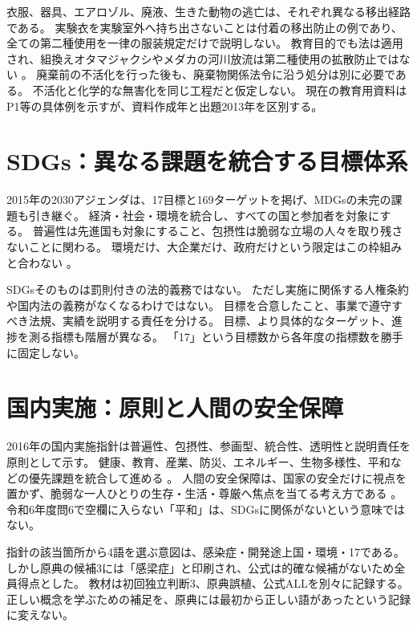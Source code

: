 衣服、器具、エアロゾル、廃液、生きた動物の逃亡は、それぞれ異なる移出経路である。
実験衣を実験室外へ持ち出さないことは付着の移出防止の例であり、全ての第二種使用を一律の服装規定だけで説明しない。
教育目的でも法は適用され、組換えオタマジャクシやメダカの河川放流は第二種使用の拡散防止ではない
\cite{env_biosafety_qa}。
廃棄前の不活化を行った後も、廃棄物関係法令に沿う処分は別に必要である。
不活化と化学的な無害化を同じ工程だと仮定しない。
現在の教育用資料はP1等の具体例を示すが、資料作成年と出題2013年を区別する\cite{env_biosafety_school}。

\section{SDGs：異なる課題を統合する目標体系}
\label{theory:environment:sdgs}
2015年の2030アジェンダは、17目標と169ターゲットを掲げ、MDGsの未完の課題も引き継ぐ。
経済・社会・環境を統合し、すべての国と参加者を対象にする。
普遍性は先進国も対象にすること、包摂性は脆弱な立場の人々を取り残さないことに関わる。
環境だけ、大企業だけ、政府だけという限定はこの枠組みと合わない
\cite{env_sdgs_agenda,env_sdgs_un}。

SDGsそのものは罰則付きの法的義務ではない\cite{env_sdgs_binding}。
ただし実施に関係する人権条約や国内法の義務がなくなるわけではない。
目標を合意したこと、事業で遵守すべき法規、実績を説明する責任を分ける。
目標、より具体的なターゲット、進捗を測る指標も階層が異なる。
「17」という目標数から各年度の指標数を勝手に固定しない。

\section{国内実施：原則と人間の安全保障}
\label{theory:environment:implementation}
2016年の国内実施指針は普遍性、包摂性、参画型、統合性、透明性と説明責任を原則として示す。
健康、教育、産業、防災、エネルギー、生物多様性、平和などの優先課題を統合して進める
\cite{env_sdgs2016,env_sdgs_pamphlet}。
人間の安全保障は、国家の安全だけに視点を置かず、脆弱な一人ひとりの生存・生活・尊厳へ焦点を当てる考え方である
\cite{env_humansecurity}。
令和6年度問6で空欄に入らない「平和」は、SDGsに関係がないという意味ではない。

\begin{tcolorbox}[title=令和元年度再試験問14の扱い]
指針の該当箇所から4語を選ぶ意図は、感染症・開発途上国・環境・17である。
しかし原典の候補3には「感梁症」と印刷され、公式は的確な候補がないため全員得点とした。
教材は初回独立判断3、原典誤植、公式ALLを別々に記録する。
正しい概念を学ぶための補足を、原典には最初から正しい語があったという記録に変えない。
\end{tcolorbox}

